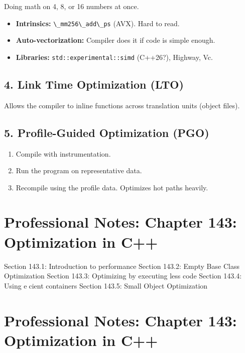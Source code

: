 Doing math on 4, 8, or 16 numbers at once.

\begin{itemize}
\tightlist
\item
  \textbf{Intrinsics:} \passthrough{\lstinline!\_mm256\_add\_ps!} (AVX).
  Hard to read.
\item
  \textbf{Auto-vectorization:} Compiler does it if code is simple
  enough.
\item
  \textbf{Libraries:} \passthrough{\lstinline!std::experimental::simd!}
  (C++26?), Highway, Vc.
\end{itemize}

\hypertarget{link-time-optimization-lto}{%
\section{4. Link Time Optimization
(LTO)}\label{link-time-optimization-lto}}

Allows the compiler to inline functions across translation units (object
files).

\hypertarget{profile-guided-optimization-pgo}{%
\section{5. Profile-Guided Optimization
(PGO)}\label{profile-guided-optimization-pgo}}

\begin{enumerate}
\def\labelenumi{\arabic{enumi}.}
\tightlist
\item
  Compile with instrumentation.
\item
  Run the program on representative data.
\item
  Recompile using the profile data. Optimizes hot paths heavily.
\end{enumerate}

\hypertarget{professional-notes-chapter-143-optimization-in-c}{%
\chapter{Professional Notes: Chapter 143: Optimization in
C++}\label{professional-notes-chapter-143-optimization-in-c}}

Section 143.1: Introduction to performance Section 143.2: Empty Base
Class Optimization Section 143.3: Optimizing by executing less code
Section 143.4: Using ecient containers Section 143.5: Small Object
Optimization

\hypertarget{professional-notes-chapter-143-optimization-in-c-1}{%
\chapter{Professional Notes: Chapter 143: Optimization in
C++}\label{professional-notes-chapter-143-optimization-in-c-1}}

